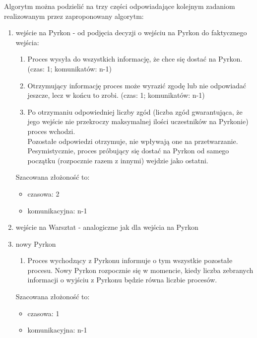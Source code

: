 \documentclass[11pt]{article}
\begin{document}
\bigskip 

Algorytm można podzielić na trzy części odpowiadające kolejnym zadaniom realizowanym przez zaproponowany algorytm:
\begin{enumerate}
\item wejście na Pyrkon - od podjęcia decyzji o wejściu na Pyrkon do faktycznego wejścia:
\begin{enumerate}
\item Proces wysyła do wszystkich informację, że chce się dostać na Pyrkon. (czas: 1; komunikatów: n-1)
\item Otrzymujący informację proces może wyrazić zgodę lub nie odpowiadać jeszcze, lecz w końcu to zrobi. (czas: 1; komunikatów: n-1)
\item Po otrzymaniu odpowiedniej liczby zgód (liczba zgód gwarantująca, że jego wejście nie przekroczy maksymalnej ilości uczestników na Pyrkonie) proces wchodzi.\\
Pozostałe odpowiedzi otrzymuje, nie wpływają one na przetwarzanie.\\
Pesymistycznie, proces próbujący się dostać na Pyrkon od samego początku (rozpocznie razem z innymi) wejdzie jako ostatni.
\end{enumerate}
Szacowana złożoność to:
\begin{itemize}
\item czasowa: 2
\item komunikacyjna: n-1
\end{itemize}
\item wejście na Warsztat - analogiczne jak dla wejścia na Pyrkon
\item nowy Pyrkon
\begin{enumerate}
\item Proces wychodzący z Pyrkonu informuje o tym wszystkie pozostałe procesu. Nowy Pyrkon rozpocznie się w momencie, kiedy liczba zebranych informacji o wyjściu z Pyrkonu będzie równa liczbie procesów.
\end{enumerate}
Szacowana złożoność to:
\begin{itemize}
\item czasowa: 1
\item komunikacyjna: n-1
\end{itemize}
\end{enumerate}
\end{document}
